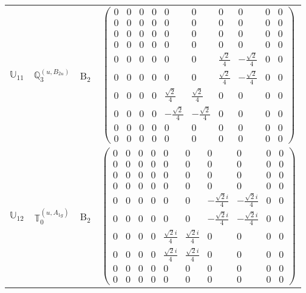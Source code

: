 \documentclass[fleqn,10pt,landscape]{article}
\begin{document}
\begin{itemize}
\begin{center}
\begin{longtable}{c|c|c|c}
$ \mathbb{U}_{11} $ & $\mathbb{Q}_{3}^{(u,B_{2u})}$ & B$_{2}$ & $\begin{pmatrix} 0 & 0 & 0 & 0 & 0 & 0 & 0 & 0 & 0 & 0 \\ 0 & 0 & 0 & 0 & 0 & 0 & 0 & 0 & 0 & 0 \\ 0 & 0 & 0 & 0 & 0 & 0 & 0 & 0 & 0 & 0 \\ 0 & 0 & 0 & 0 & 0 & 0 & 0 & 0 & 0 & 0 \\ 0 & 0 & 0 & 0 & 0 & 0 & \frac{\sqrt{2}}{4} & - \frac{\sqrt{2}}{4} & 0 & 0 \\ 0 & 0 & 0 & 0 & 0 & 0 & \frac{\sqrt{2}}{4} & - \frac{\sqrt{2}}{4} & 0 & 0 \\ 0 & 0 & 0 & 0 & \frac{\sqrt{2}}{4} & \frac{\sqrt{2}}{4} & 0 & 0 & 0 & 0 \\ 0 & 0 & 0 & 0 & - \frac{\sqrt{2}}{4} & - \frac{\sqrt{2}}{4} & 0 & 0 & 0 & 0 \\ 0 & 0 & 0 & 0 & 0 & 0 & 0 & 0 & 0 & 0 \\ 0 & 0 & 0 & 0 & 0 & 0 & 0 & 0 & 0 & 0 \end{pmatrix}$ \\
$ \mathbb{U}_{12} $ & $\mathbb{T}_{0}^{(u,A_{1g})}$ & B$_{2}$ & $\begin{pmatrix} 0 & 0 & 0 & 0 & 0 & 0 & 0 & 0 & 0 & 0 \\ 0 & 0 & 0 & 0 & 0 & 0 & 0 & 0 & 0 & 0 \\ 0 & 0 & 0 & 0 & 0 & 0 & 0 & 0 & 0 & 0 \\ 0 & 0 & 0 & 0 & 0 & 0 & 0 & 0 & 0 & 0 \\ 0 & 0 & 0 & 0 & 0 & 0 & - \frac{\sqrt{2} i}{4} & - \frac{\sqrt{2} i}{4} & 0 & 0 \\ 0 & 0 & 0 & 0 & 0 & 0 & - \frac{\sqrt{2} i}{4} & - \frac{\sqrt{2} i}{4} & 0 & 0 \\ 0 & 0 & 0 & 0 & \frac{\sqrt{2} i}{4} & \frac{\sqrt{2} i}{4} & 0 & 0 & 0 & 0 \\ 0 & 0 & 0 & 0 & \frac{\sqrt{2} i}{4} & \frac{\sqrt{2} i}{4} & 0 & 0 & 0 & 0 \\ 0 & 0 & 0 & 0 & 0 & 0 & 0 & 0 & 0 & 0 \\ 0 & 0 & 0 & 0 & 0 & 0 & 0 & 0 & 0 & 0 \end{pmatrix}$ \\

\end{longtable}
\end{center}
\end{itemize}
\end{document}
